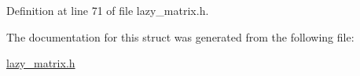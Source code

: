 Definition at line 71 of file lazy\+\_\+matrix.\+h.



The documentation for this struct was generated from the following file\+:\begin{DoxyCompactItemize}
\item 
\mbox{\hyperlink{lazy__matrix_8h}{lazy\+\_\+matrix.\+h}}\end{DoxyCompactItemize}
